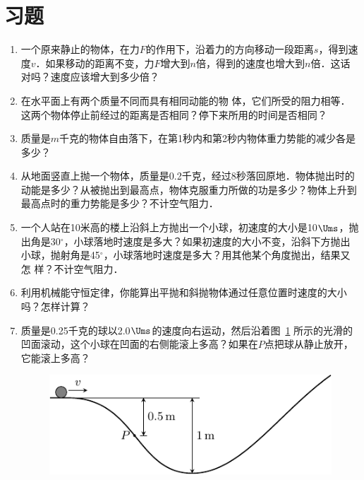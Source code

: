\section*{习题}
\begin{enumerate}
    \item 一个原来静止的物体，在力$F$的作用下，沿着力的方向移动一段距离$s$，得到速度$v$．如果移动的距离不变，力$F$增大到$n$倍，得到的速度也增大到$n$倍．这话对吗？速度应该增大到多少倍？
    \item 在水平面上有两个质量不同而具有相同动能的物
体，它们所受的阻力相等．这两个物体停止前经过的距离是否相同？停下来所用的时间是否相同？
\item 质量是$m$千克的物体自由落下，在第1秒内和第2秒内物体重力势能的减少各是多少？
\item 从地面竖直上抛一个物体，质量是0.2千克，经过8秒落回原地．物体抛出时的动能是多少？从被抛出到最高点，物体克服重力所做的功是多少？物体上升到最高点时的重力势能是多少？不计空气阻力．
\item 一个人站在10米高的楼上沿斜上方抛出一个小球，初速度的大小是10$\Ums$，抛出角是30$^\circ$，小球落地时速度是多大？如果初速度的大小不变，沿斜下方抛出小球，抛射角是45$^\circ$，小球落地时速度是多大？用其他某个角度抛出，结果又怎
样？不计空气阻力．
\item 利用机械能守恒定律，你能算出平抛和斜抛物体通过任意位置时速度的大小吗？怎样计算？
\item 质量是0.25千克的球以2.0$\Ums$的速度向右运动，然后沿着图~\ref{fig_A_7-23} 所示的光滑的凹面滚动，这个小球在凹面的右侧能滚上多高？如果在$P$点把球从静止放开，它能滚上多高？
\begin{figure}[htbp]
    \centering
    \includegraphics{fig/A/7-23.pdf}
    \caption{}\label{fig_A_7-23}
\end{figure}


\end{enumerate}
